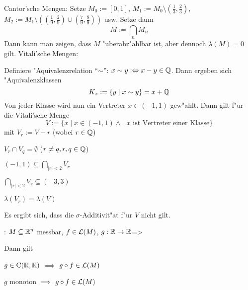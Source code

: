  Cantor'sche Mengen:{
  Setze $M_0:=[0,1]$, $M_1:=M_0\setminus (\frac 1 3,\frac 2 3)$, 
  $M_2:=M_1\setminus ((\frac 1 9,\frac 2 9 ) \cup (\frac 7 9, \frac 8 9))$ usw.
  Setze dann
  \[M:=\bigcap_n M_n
    \]
  Dann kann man zeigen, dass $M$ "uberabz"ahlbar ist, aber dennoch 
  $\lambda(M)=0$ gilt.
  }
 Vitali'sche Mengen:{
  Definiere "Aquivalenzrelation ``$\sim$'': $x\sim y:\Leftrightarrow x-y\in\mathbb Q$. Dann
  ergeben sich "Aquivalenzklassen
  \[K_x:=\{y\mid x\sim y\}=x+\mathbb Q
    \]
  Von jeder Klasse wird nun ein Vertreter $x\in(-1,1)$ gew"ahlt.
  Dann gilt f"ur die Vitali'sche Menge
  \[V:=\{x\mid x\in(-1,1)\land \text{ $x$ ist Vertreter einer Klasse}\}
    \]
  mit $V_r:=V+r$ (wobei $r\in\mathbb Q$)
  \begin{stmts}
    \item $V_r\cap V_q=\emptyset$ ($r\ne q,r,q\in\mathbb Q$)
    \item $(-1,1)\subseteq \bigcap_{|r|<2} V_r$
    \item $\bigcap_{|r|<2} V_r\subseteq (-3,3)$
    \item $\lambda(V_r)=\lambda(V)$
    \item Es ergibt sich, dass die $\sigma$-Additivit"at f"ur $V$ nicht gilt.
    \end{stmts}
  }
\theorem:
  $M\subseteq \mathbb R^n$ messbar, $f\in\mathcal{L}(M)$, $g:\mathbb R\to\mathbb R$=>{
  Dann gilt
  \begin{stmts} 
    \item $g\in{\rm C}(\mathbb R,\mathbb R)$ $\implies$ $g\circ f\in\mathcal{L}(M)$
    \item $g$ monoton $\implies$ $g\circ f\in\mathcal{L}(M)$
    \end{stmts}
  }
